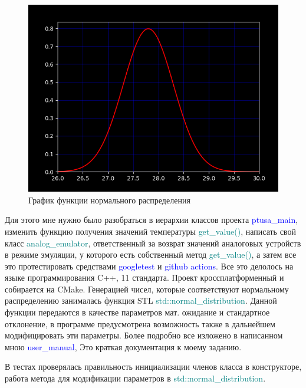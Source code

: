 \begin{figure}[ht]
 \centering
		\includegraphics[height =10 cm, keepaspectratio]{images/normal.png}
		\caption{ График функции нормального распределения }
		\label{fig:normal}
\end{figure}

Для этого мне нужно было разобраться в иерархии классов проекта \textcolor{blue}{ptusa\_main}, изменить функцию получения значений температуры \textcolor{teal}{get\_value()}, написать свой класс \textcolor{teal}{analog\_emulator}, ответственный за возврат значений аналоговых устройств в режиме эмуляции, у которого есть собственный метод \textcolor{teal}{get\_value()}, а затем все это протестировать средствами \textcolor{blue}{googletest} и \textcolor{blue}{github actions}. Все это делолось на языке программирования C++, 11 стандарта. Проект кроссплатформенный и собирается на CMake. Генерацией чисел, которые соответствуют нормальному распределению занималась функция STL \textcolor{teal}{std::normal\_distribution}. Данной функции передаются в качестве параметров мат. ожидание и стандартное отклонение, в программе предусмотрена возможность также в дальнейшем модифицировать эти параметры. Более подробно все изложено в написанном мною {\textcolor{blue}{user\_manual}}, Это краткая документация к моему заданию. 

В тестах проверялась правильность инициализации членов класса в конструкторе, работа метода для модификации параметров  в \textcolor{teal}{std::normal\_distribution}.
